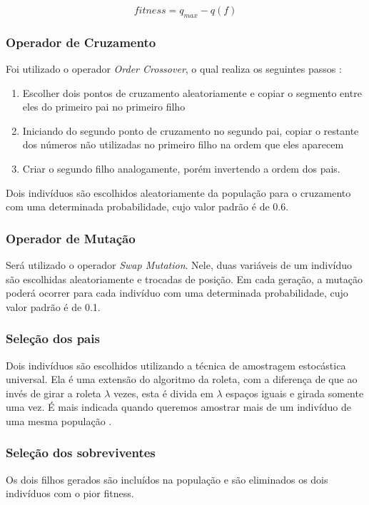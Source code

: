 \documentclass[conference]{IEEEtran}
\begin{document}
\begin{equation}
fitness=q_{max} - q(f)
\end{equation}

\subsubsection{Operador de Cruzamento}
Foi utilizado o operador \textit{Order Crossover}, o qual realiza os seguintes passos \cite{eibenbook}:
\begin{enumerate}
	\item Escolher dois pontos de cruzamento aleatoriamente e copiar o segmento entre eles do primeiro pai no primeiro filho
	\item Iniciando do segundo ponto de cruzamento no segundo pai, copiar o restante dos números não utilizadas no primeiro filho na ordem que eles aparecem
	\item Criar o segundo filho analogamente, porém invertendo a ordem dos pais.
\end{enumerate}  
Dois indivíduos são escolhidos aleatoriamente da população para o cruzamento com uma determinada probabilidade, cujo valor padrão é de 0.6.

\subsubsection{Operador de Mutação}
Será utilizado o operador \textit{Swap Mutation}. Nele, duas variáveis de um indivíduo são escolhidas aleatoriamente e trocadas de posição. Em cada geração, a mutação poderá ocorrer para cada indivíduo com uma determinada probabilidade, cujo valor padrão é de 0.1.

\subsubsection{Seleção dos pais}
Dois indivíduos são escolhidos utilizando a técnica de amostragem estocástica universal. Ela é uma extensão do algoritmo da roleta, com a diferença de que ao invés de girar a roleta $\lambda$ vezes, esta é divida em $\lambda$ espaços iguais e girada somente uma vez. É mais indicada quando queremos amostrar mais de um indivíduo de uma mesma população \cite{eibenbook}.

\subsubsection{Seleção dos sobreviventes}
Os dois filhos gerados são incluídos na população e são eliminados os dois indivíduos com o pior fitness. 
\end{document}
